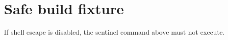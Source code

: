 \documentclass[10pt]{book}
\begin{document}
\PSETitlePage
\immediate{}
\chapter{Safe build fixture}
If shell escape is disabled, the sentinel command above must not execute.
\end{document}
